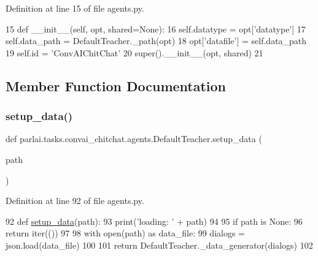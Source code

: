 Definition at line 15 of file agents.\+py.


\begin{DoxyCode}
15     \textcolor{keyword}{def }\_\_init\_\_(self, opt, shared=None):
16         self.datatype = opt[\textcolor{stringliteral}{'datatype'}]
17         self.data\_path = DefaultTeacher.\_path(opt)
18         opt[\textcolor{stringliteral}{'datafile'}] = self.data\_path
19         self.id = \textcolor{stringliteral}{'ConvAIChitChat'}
20         super().\_\_init\_\_(opt, shared)
21 
\end{DoxyCode}


\subsection{Member Function Documentation}
\mbox{\label{classparlai_1_1tasks_1_1convai__chitchat_1_1agents_1_1DefaultTeacher_ae17f41ea4d68f93805f171935a3caa13}} 
\subsubsection{\texorpdfstring{setup\+\_\+data()}{setup\_data()}}
{\footnotesize\ttfamily def parlai.\+tasks.\+convai\+\_\+chitchat.\+agents.\+Default\+Teacher.\+setup\+\_\+data (\begin{DoxyParamCaption}\item[{}]{path }\end{DoxyParamCaption})\hspace{0.3cm}{\ttfamily [static]}}



Definition at line 92 of file agents.\+py.


\begin{DoxyCode}
92     \textcolor{keyword}{def }\hyperlink{namespaceparlai_1_1tasks_1_1multinli_1_1agents_a4fa2cb0ba1ed745336ad8bceed36b841}{setup\_data}(path):
93         print(\textcolor{stringliteral}{'loading: '} + path)
94 
95         \textcolor{keywordflow}{if} path \textcolor{keywordflow}{is} \textcolor{keywordtype}{None}:
96             \textcolor{keywordflow}{return} iter(())
97 
98         with open(path) \textcolor{keyword}{as} data\_file:
99             dialogs = json.load(data\_file)
100 
101         \textcolor{keywordflow}{return} DefaultTeacher.\_data\_generator(dialogs)
102 \end{DoxyCode}


